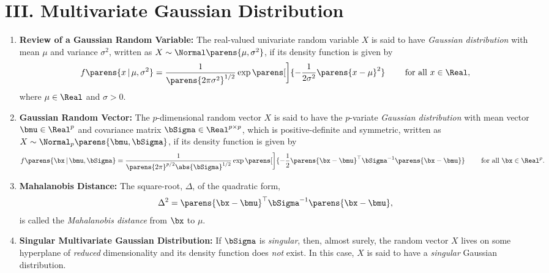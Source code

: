 \documentclass[12pt]{article}
\begin{document}
\section*{III. Multivariate Gaussian Distribution} 

\begin{enumerate}[label=\textbf{\arabic*.}]

	\item \textbf{Review of a Gaussian Random Variable:} The real-valued univariate random variable $X$ is said to have \textit{Gaussian distribution} with mean $\mu$ and variance $\sigma^2$, written as $X \sim \Normal \parens{\mu, \sigma^2}$, if its density function is given by 
	\begin{align*}
		f \parens{x \,\vert\, \mu, \sigma^2} = \frac{1}{ \parens{2 \pi \sigma^2}^{1/2}} \exp \parens[\bigg]{-\frac{1}{2\sigma^2} \parens{x-\mu}^2} \qquad \text{ for all } x \in \Real, 
	\end{align*}
	where $\mu \in \Real$ and $\sigma > 0$. 
	
	\item \textbf{Gaussian Random Vector:} The $p$-dimensional random vector $X$ is said to have the $p$-variate \textit{Gaussian distribution} with mean vector $\bmu \in \Real^p$ and covariance matrix $\bSigma \in \Real^{p \times p}$, which is positive-definite and symmetric, written as $X \sim \Normal_p \parens{\bmu, \bSigma}$, if its density function is given by
	\begin{align*}
		f \parens{\bx \,\vert\, \bmu, \bSigma} = \frac{1}{ \parens{2\pi}^{p/2} \abs{\bSigma}^{1/2}} \exp \parens[\bigg]{-\frac{1}{2} \parens{\bx-\bmu}^\top \bSigma^{-1} \parens{\bx - \bmu}} \qquad \text{ for all } \bx \in \Real^p. 
	\end{align*}
	
	\item \textbf{Mahalanobis Distance:} The square-root, $\Delta$, of the quadratic form, 
	\begin{align*}
		\Delta^2 = \parens{\bx - \bmu}^\top \bSigma^{-1} \parens{\bx - \bmu}, 
	\end{align*}
	is called the \textit{Mahalanobis distance} from $\bx$ to $\mu$. 
	
	\item \textbf{Singular Multivariate Gaussian Distribution:} If $\bSigma$ is \textit{singular}, then, almost surely, the random vector $X$ lives on some hyperplane of \textit{reduced} dimensionality and its density function does \emph{not} exist. In this case, $X$ is said to have a \textit{singular} Gaussian distribution. 
	

\end{enumerate}
\end{document}
